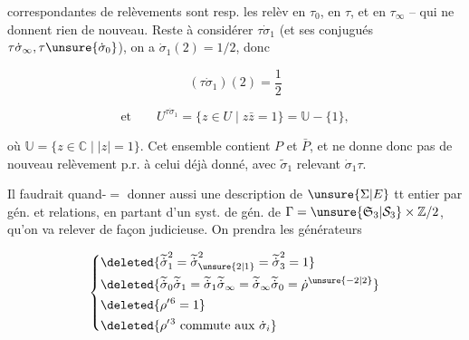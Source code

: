 
correspondantes de relèvements  sont resp. les relèv en $\tau_0$, en $\tau$, et en $\tau_\infty$ -- qui ne donnent rien de nouveau. Reste à considérer $\tau\dot\sigma_1$ (et ses conjugués  $\tau\dot\sigma_\infty,\tau\unsure{\dot\sigma_0}$), on a $\dot\sigma_1(2)=1/2$, donc

\[
(\tau\dot\sigma_1)(2)=\frac12
\]

\[
\text{et}\qquad U^{\tau\dot\sigma_1}=\{z\in U\mid z\bar z=1\}=\mathbb U-\{1\},
\]

où $\mathbb U=\{z\in\mathbb C\mid |z|=1\}$. Cet ensemble contient $P$ et $\bar P$, et ne donne donc pas de nouveau relèvement p.r. à celui déjà donné, avec $\widetilde\sigma_1$ relevant $\dot\sigma_1\tau$.

Il faudrait quand-$=$ donner aussi une description de $\unsure{\Sigma|E}$ tt entier par gén. et relations, en partant d'un syst. de gén. de $\Gamma=\unsure{\mathfrak S_3|\mathcal S_3}\times\mathbb Z/2$, qu'on va relever de façon judicieuse. On prendra les  générateurs




\[
\left\{\begin{aligned}
&\deleted{\widetilde{\dot\sigma}_1^2=\widetilde{\dot\sigma}_{\unsure{2|1}}^2=\widetilde{\dot\sigma}_3^2=1}\\
&\deleted{\widetilde{\dot\sigma}_0\widetilde{\dot\sigma}_1=\widetilde{\dot\sigma}_1\widetilde{\dot\sigma}_\infty=\widetilde{\dot\sigma}_\infty\widetilde{\dot\sigma}_0=\dot\rho^{\unsure{-2|2}}}\\
&\deleted{\rho'{}^6=1}\\
&\deleted{\rho'{}^3\ \text{commute aux }\dot\sigma_i}
\end{aligned}\right.
\]
